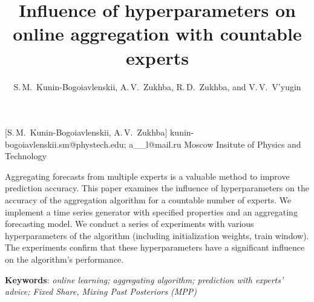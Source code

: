 \documentclass[12pt, twoside]{article}
\begin{document}
\English

\title
    [] %
    {Influence of hyperparameters on online aggregation with countable experts} %
\author
    [S.\,M.~Kunin-Bogoiavlenskii] %
    {S.\,M.~Kunin-Bogoiavlenskii, A.\,V.~Zukhba, R.\,D.~Zukhba, and V.\,V.~V’yugin} %
    [S.\,M.~Kunin-Bogoiavlenskii, A.\,V.~Zukhba] %
\email
    {kunin-bogoiavlenskii.sm@phystech.edu; a\_\_l@mail.ru}
\organization
    {Moscow Insitute of Physics and Technology}
\abstract
    {

    Aggregating forecasts from multiple experts is a valuable method to improve prediction accuracy.
    This paper examines the influence of hyperparameters on the accuracy of the aggregation algorithm for a countable number of experts.
    We implement a time series generator with specified properties and an aggregating forecasting model. 
    We conduct a series of experiments with various hyperparameters of the algorithm (including initialization weights, train window). 
    The experiments confirm that these hyperparameters have a significant influence on the algorithm's performance.           
        
%   
%   
%   
%               
    \noindent
        \textbf{Keywords}: \emph{online learning; aggregating algorithm; prediction with experts’ advice; Fixed Share, Mixing Past Posteriors (MPP)}}

\end{document}
